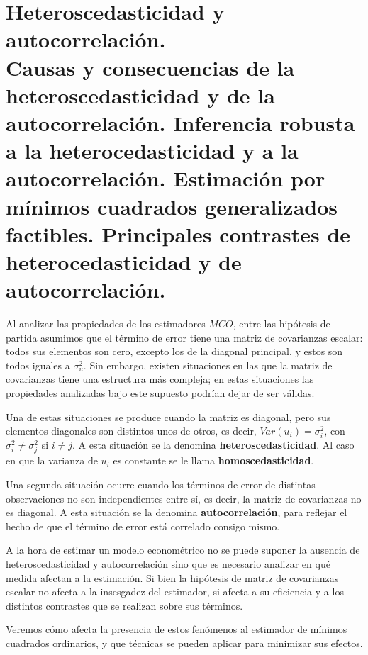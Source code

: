 
\chapter[Heteroscedasticidad y autocorrelaci\'on.]{Heteroscedasticidad y autocorrelaci\'on. \\
\normalsize Causas y consecuencias de la heteroscedasticidad y de la autocorrelaci\'on. Inferencia robusta a la heterocedasticidad y a la autocorrelaci\'on. Estimaci\'on por m\'inimos cuadrados generalizados factibles. Principales contrastes de heterocedasticidad y de autocorrelaci\'on.}



Al analizar las propiedades de los estimadores $MCO$, entre las hip\'otesis de partida asumimos que el t\'ermino de error tiene una matriz de covarianzas escalar: todos sus elementos son cero, excepto los de la diagonal principal, y estos son todos iguales a $\sigma_{u}^{2}$. Sin embargo, existen situaciones en las que la matriz de covarianzas tiene una estructura m\'as compleja; en estas situaciones las propiedades analizadas bajo este supuesto podr\'ian dejar de ser v\'alidas.

Una de estas situaciones se produce cuando la matriz es diagonal, pero sus elementos diagonales son distintos unos de otros, es decir, $Var(u_{i})=\sigma_{i}^{2}$, con $\sigma_{i}^{2}\neq\sigma_{j}^{2}$ si $i\neq j$. A esta situaci\'on se la denomina \textbf{heteroscedasticidad}. Al caso en que la varianza de $u_{i}$ es constante se le llama \textbf{homoscedasticidad}.

Una segunda situaci\'on ocurre cuando los t\'erminos de error de distintas observaciones no son independientes entre s\'i, es decir, la matriz de covarianzas no es diagonal. A esta situaci\'on se la denomina \textbf{autocorrelaci\'on},
para reflejar el hecho de que el t\'ermino de error est\'a correlado consigo mismo.

A la hora de estimar un modelo econom\'etrico no se puede suponer la ausencia de heteroscedasticidad y autocorrelaci\'on sino que es necesario analizar en qu\'e medida afectan a la estimaci\'on. Si bien la hip\'otesis de matriz de covarianzas escalar no afecta a la insesgadez del estimador, si afecta a su eficiencia y a los distintos contrastes que se realizan sobre sus t\'erminos.

Veremos c\'omo afecta la presencia de estos fen\'omenos al estimador de m\'inimos cuadrados ordinarios, y que t\'ecnicas se pueden aplicar para minimizar sus efectos.


